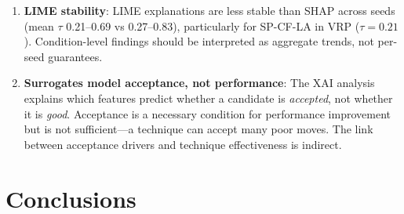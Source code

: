 \documentclass[11pt,a4paper]{article}
\begin{document}
\begin{enumerate}
  \item \textbf{LIME stability}: LIME explanations are less stable than SHAP across
    seeds (mean $\tau$ 0.21--0.69 vs 0.27--0.83), particularly for SP-CF-LA in VRP
    ($\tau = 0.21$). Condition-level findings should be interpreted as aggregate
    trends, not per-seed guarantees.

  \item \textbf{Surrogates model acceptance, not performance}: The XAI analysis
    explains which features predict whether a candidate is \emph{accepted}, not
    whether it is \emph{good}. Acceptance is a necessary condition for performance
    improvement but is not sufficient---a technique can accept many poor moves. The
    link between acceptance drivers and technique effectiveness is indirect.
\end{enumerate}

\section{Conclusions}
\end{document}
